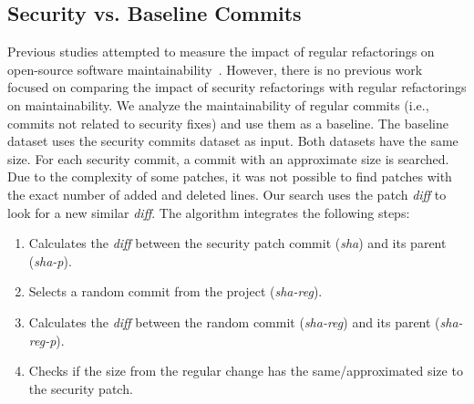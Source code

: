 \documentclass[10pt,conference]{IEEEtran}
\begin{document}
%
\subsection{Security vs. Baseline Commits}
%
Previous studies attempted to measure the impact of regular refactorings on
open-source software maintainability~\cite{HEGEDUS2018313}. However, there is no
previous work focused on comparing the impact of security refactorings with
regular refactorings on maintainability.
We analyze the maintainability of regular commits (i.e., commits not related
to security fixes) and use them as a baseline.
The baseline dataset uses the security commits dataset as input.
Both datasets have the same size. For each
security commit, a commit with an approximate size is searched. Due to the complexity 
of some patches, it was not possible to find patches with the exact number of added and 
deleted lines. Our search uses the patch \emph{diff} to look for a new similar \emph{diff}. 
The algorithm integrates the following steps:

\begin{enumerate}
\item Calculates the \emph{diff} between the security patch commit (\emph{sha}) and its parent (\emph{sha-p}).
\item Selects a random commit from the project (\emph{sha-reg}).
\item Calculates the \emph{diff} between the random commit (\emph{sha-reg}) and its parent (\emph{sha-reg-p}).
\item Checks if the size from the regular change has the same/approximated size to 
the security patch.
\end{enumerate}
\end{document}
